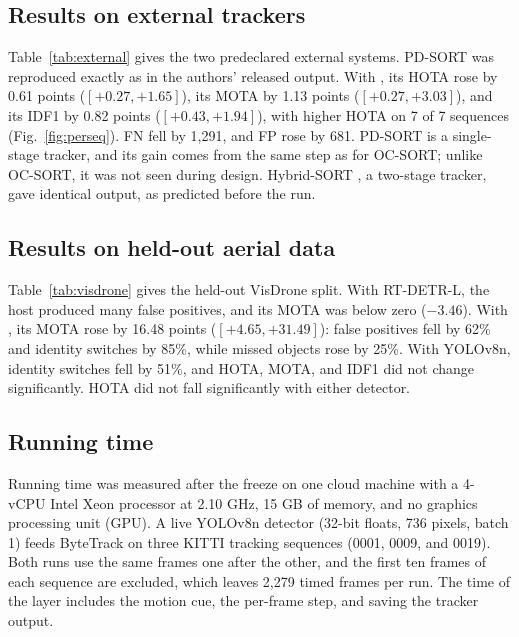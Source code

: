 \subsection{Results on external trackers}\label{sec:external}
Table~\ref{tab:external} gives the two predeclared external systems. PD-SORT
\cite{wang2025pdsort} was reproduced exactly as in the authors' released
output. With \scl{}, its HOTA rose by 0.61 points ($[+0.27,+1.65]$), its
MOTA by 1.13 points ($[+0.27,+3.03]$), and its IDF1 by 0.82 points
($[+0.43,+1.94]$), with higher HOTA on 7 of 7 sequences
(Fig.~\ref{fig:perseq}). FN fell by 1,291, and FP rose by 681. PD-SORT is a single-stage tracker, and its gain comes from the same
step as for OC-SORT; unlike OC-SORT, it was not seen during design.
Hybrid-SORT \cite{yang2024hybridsort}, a two-stage tracker, gave identical
output, as predicted before the run.



\subsection{Results on held-out aerial data}\label{sec:visdrone}
Table~\ref{tab:visdrone} gives the held-out VisDrone split. With RT-DETR-L,
the host produced many false positives, and its MOTA was below zero
($-3.46$). With \scl{}, its MOTA rose by 16.48 points ($[+4.65,+31.49]$):
false positives fell by 62\% and identity switches by 85\%, while missed
objects rose by 25\%. With YOLOv8n, identity switches fell by 51\%, and HOTA,
MOTA, and IDF1 did not change significantly. HOTA did not fall significantly
with either detector.



\subsection{Running time}\label{sec:latency}
\label{sec:latency-setup}Running time was measured after the freeze on one cloud machine with a 4-vCPU
Intel Xeon processor at 2.10 GHz, 15 GB of memory, and no graphics processing unit (GPU). A live YOLOv8n
detector (32-bit floats, 736 pixels, batch 1) feeds ByteTrack on three KITTI
tracking sequences (0001, 0009, and 0019). Both runs use the same frames
one after the other, and the first ten frames of each sequence are excluded,
which leaves 2,279 timed frames per run. The time of the layer includes the
motion cue, the per-frame step, and saving the tracker output.

